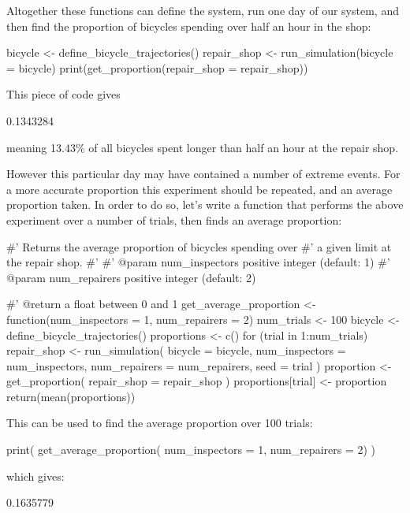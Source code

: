 Altogether these functions can define the system, run one day of our system, and
then find the proportion of bicycles spending over half an hour in the shop:

\begin{Rin}
bicycle <- define_bicycle_trajectories()
repair_shop <- run_simulation(bicycle = bicycle)
print(get_proportion(repair_shop = repair_shop))
\end{Rin}

This piece of code gives

\begin{Rout}
[1] 0.1343284
\end{Rout}

meaning 13.43\% of all bicycles spent longer than half an hour at the repair
shop.

However this particular day may have contained a number of extreme events.
For a more accurate proportion this experiment should be repeated, and an
average proportion taken.
In order to do so, let's write a function that performs the above experiment
over a number of trials, then finds an average proportion:

\begin{Rin}
#' Returns the average proportion of bicycles spending over
#' a given limit at the repair shop.
#'
#' @param num_inspectors positive integer (default: 1)
#' @param num_repairers positive integer (default: 2)

#' @return a float between 0 and 1
get_average_proportion <- function(num_inspectors = 1,
                                   num_repairers = 2) {
  num_trials <- 100
  bicycle <- define_bicycle_trajectories()
  proportions <- c()
  for (trial in 1:num_trials) {
    repair_shop <- run_simulation(
      bicycle = bicycle,
      num_inspectors = num_inspectors,
      num_repairers = num_repairers,
      seed = trial
    )
    proportion <- get_proportion(
      repair_shop = repair_shop
    )
    proportions[trial] <- proportion
  }
  return(mean(proportions))
}
\end{Rin}

This can be used to find the average proportion over 100 trials:

\begin{Rin}
print(
  get_average_proportion(
    num_inspectors = 1,
    num_repairers = 2)
)
\end{Rin}

which gives:

\begin{Rout}
[1] 0.1635779
\end{Rout}


